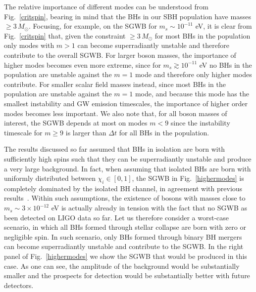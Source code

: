 \documentclass[
reprint,           %
superscriptaddress,%
amsmath,           %
amssymb,           %
aps,               %
prd,               %
notitlepage,       %
floatfix,          %
nofootinbib %
]{revtex4-1}
\begin{document}
The relative importance of different modes can be understood from Fig.~\ref{critspin}, bearing in mind that the BHs in our SBH population have masses $\geq 3\,M_{\odot}$. Focusing, for example, on the SGWB for $m_s\sim 10^{-11}$ eV, it is clear from Fig.~\ref{critspin} that, given the constraint $\geq 3\,M_{\odot}$ for most BHs in the population only modes with $m>1$ can become superradiantly unstable and therefore contribute to the overall SGWB. For larger boson masses, the importance of higher modes becomes even more extreme, since for $m_s\gtrsim 10^{-11}$ eV no BHs in the population are unstable against the $m=1$ mode and therefore only higher modes contribute. For smaller scalar field masses instead, since most BHs in the population are unstable against the $m=1$ mode, and because this mode has the smallest instability and GW emission timescales, the importance of higher order modes becomes less important. We also note that, for all boson masses of interest, the SGWB depends at most on modes $m<9$ since the instability timescale for $m\geq 9$ is larger than $\Delta t$ for all BHs in the population. 

The results discussed so far assumed that BHs in isolation are born with sufficiently high spins such that they can be superradiantly unstable and produce a very large background. In fact, when assuming that isolated BHs are born with uniformly distributed between $\chi_i \in [0,1]$, the SGWB in Fig.~\ref{highermodes} is completely dominated by the isolated BH channel, in agreement with previous results~\cite{Tsukada:2018mbp,Tsukada:2020lgt}. Within such assumptions, the existence of bosons with masses close to $m_s \sim 3 \times  10^{-12}$ eV is actually already in tension with the fact that no SGWB as been detected on LIGO data so far. Let us therefore consider a worst-case scenario, in which all BHs formed through stellar collapse are born with zero or negligible spin. In such scenario, only BHs formed through binary BH mergers can become superradiantly unstable and contribute to the SGWB. In the right panel of Fig.~\ref{highermodes} we show the SGWB that would be produced in this case. As one can see, the amplitude of the background would be substantially smaller and the prospects for detection would be substantially better with future detectors.
\end{document}
